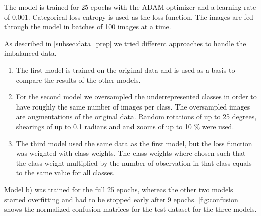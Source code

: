 \documentclass[12pt]{article}
\begin{document}
The model is trained for 25 epochs with the ADAM optimizer and a learning rate of 0.001. Categorical loss entropy is used as the loss function. The images are fed through the model in batches of 100 images at a time.

As described in \autoref{subsec:data_prep} we tried different approaches to handle the imbalanced data. 

\begin{enumerate}[label=(\alph*)]
\item The first model is trained on the original data and is used as a basis to compare the results of the other models.
\item For the second model we oversampled the underrepresented classes in order to have roughly the same number of images per class. The oversampled images are augmentations of the original data. Random rotations of up to 25 degrees, shearings of up to 0.1 radians and and zooms of up to 10 \% were used.
\item The third model used the same data as the first model, but the loss function was weighted with class weights. The class weights where chosen such that the class weight multiplied by the number of observation in that class equals to the same value for all classes.
\end{enumerate}

Model b) was trained for the full 25 epochs, whereas the other two models started overfitting and had to be stopped early after 9 epochs. \autoref{fig:confusion} shows the normalized confusion matrices for the test dataset for the three models.
\end{document}
